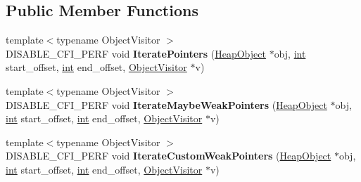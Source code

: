 \subsection*{Public Member Functions}
\begin{DoxyCompactItemize}
\item 
\mbox{\label{classv8_1_1internal_1_1BodyDescriptorBase_a7b8a9a27a9fe57c60469d1459ef048e8}} 
{\footnotesize template$<$typename Object\+Visitor $>$ }\\D\+I\+S\+A\+B\+L\+E\+\_\+\+C\+F\+I\+\_\+\+P\+E\+RF void {\bfseries Iterate\+Pointers} (\mbox{\hyperlink{classv8_1_1internal_1_1HeapObject}{Heap\+Object}} $\ast$obj, \mbox{\hyperlink{classint}{int}} start\+\_\+offset, \mbox{\hyperlink{classint}{int}} end\+\_\+offset, \mbox{\hyperlink{classv8_1_1internal_1_1ObjectVisitor}{Object\+Visitor}} $\ast$v)
\item 
\mbox{\label{classv8_1_1internal_1_1BodyDescriptorBase_a7e2b2768bf0d4c101a0f37d57999365d}} 
{\footnotesize template$<$typename Object\+Visitor $>$ }\\D\+I\+S\+A\+B\+L\+E\+\_\+\+C\+F\+I\+\_\+\+P\+E\+RF void {\bfseries Iterate\+Maybe\+Weak\+Pointers} (\mbox{\hyperlink{classv8_1_1internal_1_1HeapObject}{Heap\+Object}} $\ast$obj, \mbox{\hyperlink{classint}{int}} start\+\_\+offset, \mbox{\hyperlink{classint}{int}} end\+\_\+offset, \mbox{\hyperlink{classv8_1_1internal_1_1ObjectVisitor}{Object\+Visitor}} $\ast$v)
\item 
\mbox{\label{classv8_1_1internal_1_1BodyDescriptorBase_acb2168f681b83cbf12b4107008b54504}} 
{\footnotesize template$<$typename Object\+Visitor $>$ }\\D\+I\+S\+A\+B\+L\+E\+\_\+\+C\+F\+I\+\_\+\+P\+E\+RF void {\bfseries Iterate\+Custom\+Weak\+Pointers} (\mbox{\hyperlink{classv8_1_1internal_1_1HeapObject}{Heap\+Object}} $\ast$obj, \mbox{\hyperlink{classint}{int}} start\+\_\+offset, \mbox{\hyperlink{classint}{int}} end\+\_\+offset, \mbox{\hyperlink{classv8_1_1internal_1_1ObjectVisitor}{Object\+Visitor}} $\ast$v)
\end{DoxyCompactItemize}
